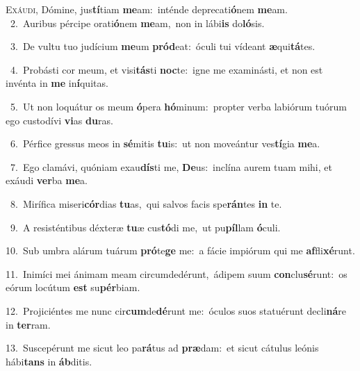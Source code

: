 \lettrine{\initial\textcolor{\initialcolor}{E}}{xáudi,} Dómine, jus\-\textbf{tí}\-tiam \textbf{me}\-am:~\star inténde deprecati\-\textbf{ó}\-nem \textbf{me}\-am.\\
{\numbfont\textcolor{\numbcolor}{~2.}}~Auribus pércipe orati\-\textbf{ó}\-nem \textbf{me}\-am,~\star non in lábi\textbf{is} do\-\textbf{ló}\-sis.\par
{\numbfont\textcolor{\numbcolor}{~3.}}~De vultu tuo judícium \textbf{me}\-um \textbf{pród}\-eat:~\star óculi tui vídeant \textbf{æ}\-qui\-\textbf{tá}\-tes.\par
{\numbfont\textcolor{\numbcolor}{~4.}}~Probásti cor meum, et visi\-\textbf{tás}\-ti \textbf{noc}\-te:~\star igne me examinásti, et non est invénta in \textbf{me} in\-\textbf{í}\-quitas.\par
{\numbfont\textcolor{\numbcolor}{~5.}}~Ut non loquátur os meum \textbf{ó}\-pera \textbf{hó}\-minum:~\star propter verba labiórum tuórum ego custodívi \textbf{vi}\-as \textbf{du}\-ras.\par
{\numbfont\textcolor{\numbcolor}{~6.}}~Pérfice gressus meos in \textbf{sé}\-mitis \textbf{tu}\-is:~\star ut non moveántur ves\-\textbf{tí}\-gia \textbf{me}\-a.\par
{\numbfont\textcolor{\numbcolor}{~7.}}~Ego clamávi, quóniam exau\-\textbf{dís}\-ti me, \textbf{De}\-us:~\star inclína aurem tuam mihi, et exáudi \textbf{ver}\-ba \textbf{me}\-a.\par
{\numbfont\textcolor{\numbcolor}{~8.}}~Mirífica miseri\-\textbf{cór}\-dias \textbf{tu}\-as,~\star qui salvos facis spe\-\textbf{rán}\-tes \textbf{in} te.\par
{\numbfont\textcolor{\numbcolor}{~9.}}~A resisténtibus déxteræ \textbf{tu}\-æ cus\-\textbf{tó}\-di me,~\star ut pu\-\textbf{píl}\-lam \textbf{ó}\-culi.\par
{\numbfont\textcolor{\numbcolor}{10.}}~Sub umbra alárum tuárum \textbf{pró}\-te\textbf{ge} me:~\star a fácie impiórum qui me \textbf{af}\-fli\-\textbf{xé}\-runt.\par
{\numbfont\textcolor{\numbcolor}{11.}}~Inimíci mei ánimam meam circumdedérunt,~\dagger ádipem suum \textbf{con}\-clu\-\textbf{sé}\-runt:~\star os eórum locútum \textbf{est} su\-\textbf{pér}\-biam.\par
{\numbfont\textcolor{\numbcolor}{12.}}~Projiciéntes me nunc cir\-\textbf{cum}\-de\-\textbf{dé}\-runt me:~\star óculos suos statuérunt decli\-\textbf{ná}\-re in \textbf{ter}\-ram.\par
{\numbfont\textcolor{\numbcolor}{13.}}~Suscepérunt me sicut leo pa\-\textbf{rá}\-tus ad \textbf{præ}\-dam:~\star et sicut cátulus leónis hábi\textbf{tans} in \textbf{áb}\-ditis.\par
